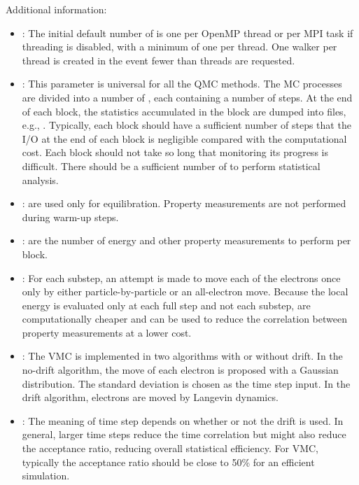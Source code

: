 Additional information:
\begin{itemize}
\item {}: The initial default number of  is one per OpenMP thread or per MPI task if threading is disabled, with a minimum of one per thread. One walker per thread is created in the event fewer  than threads are requested. 

\item {}: This parameter is universal for all the QMC
  methods. The MC processes are divided into a number of
  , each containing a number of steps. At the end of each block,
  the statistics accumulated in the block are dumped into files,
  e.g., . Typically, each block should have a sufficient number of steps that the I/O at the end of each block is negligible
  compared with the computational cost. Each block should not take so
  long that monitoring its progress is difficult. There should be a
  sufficient number of  to perform statistical analysis.

\item {}:  are used only for
  equilibration. Property measurements are not performed during
  warm-up steps.

\item {}:  are the number of energy and other property measurements to perform per block.
  
\item {}: For each substep, an attempt is made to move each of the electrons once only by either particle-by-particle or an
  all-electron move.  Because the local energy is evaluated only at
  each full step and not each substep,  are computationally cheaper
  and can be used to reduce the correlation between property measurements
  at a lower cost.
  
\item {}: The VMC is implemented in two algorithms with
  or without drift. In the no-drift algorithm, the move of each
  electron is proposed with a Gaussian distribution. The standard
  deviation is chosen as the time step input. In the drift algorithm,
  electrons are moved by Langevin dynamics.

\item {}: The meaning of time step depends on whether or not
  the drift is used. In general, larger time steps reduce the
  time correlation but might also reduce the acceptance ratio,
  reducing overall statistical efficiency. For VMC, typically the
  acceptance ratio should be close to 50\% for an efficient
  simulation.


\end{itemize}
